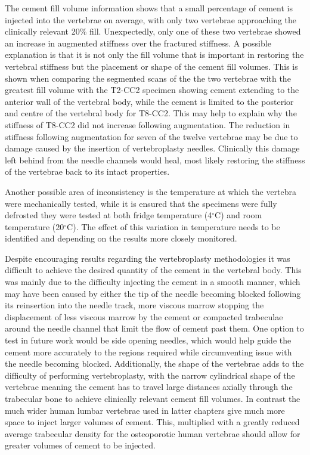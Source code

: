 The cement fill volume information shows that a small percentage of cement is
injected into the vertebrae on average, with only two vertebrae approaching the
clinically relevant 20\% fill.  Unexpectedly, only one of these two vertebrae
showed an increase in augmented stiffness over the fractured stiffness.  A
possible explanation is that it is not only the fill volume that is important
in restoring the vertebral stiffness but the placement or shape of the cement
fill volumes.  This is shown when comparing the segmented scans of the the two
vertebrae with the greatest fill volume with the T2-CC2 specimen showing cement
extending to the anterior wall of the vertebral body, while the cement is
limited to the posterior and centre of the vertebral body for T8-CC2.  This may
help to explain why the stiffness of T8-CC2 did not increase following
augmentation.  The reduction in stiffness following augmentation for seven of
the twelve vertebrae may be due to damage caused by the insertion of
vertebroplasty needles.  Clinically this damage left behind from the needle
channels would heal, most likely restoring the stiffness of the vertebrae back
to its intact properties.

Another possible area of inconsistency is the temperature at which the vertebra
were mechanically tested, while it is ensured that the specimens were fully
defrosted they were tested at both fridge temperature (4$^\circ$C) and room
temperature (20$^\circ$C).  The effect of this variation in temperature needs
to be identified and depending on the results more closely monitored.

Despite encouraging results regarding the vertebroplasty methodologies it was
difficult to achieve the desired quantity of the cement in the vertebral body.
This was mainly due to the difficulty injecting the cement in a smooth manner,
which may have been caused by either the tip of the needle becoming blocked
following its reinsertion into the needle track, more viscous marrow stopping
the displacement of less viscous marrow by the cement or compacted trabeculae
around the needle channel that limit the flow of cement past them.  One option
to test in future work would be side opening needles, which would help guide
the cement more accurately to the regions required while circumventing issue
with the needle becoming blocked.  Additionally, the shape of the vertebrae
adds to the difficulty of performing vertebroplasty, with the narrow
cylindrical shape of the vertebrae meaning the cement has to travel large
distances axially through the trabecular bone to achieve clinically relevant
cement fill volumes.  In contrast the much wider human lumbar vertebrae used in
latter chapters give much more space to inject larger volumes of cement.  This,
multiplied with a greatly reduced average trabecular density for the
osteoporotic human vertebrae should allow for greater volumes of cement to be
injected. 


